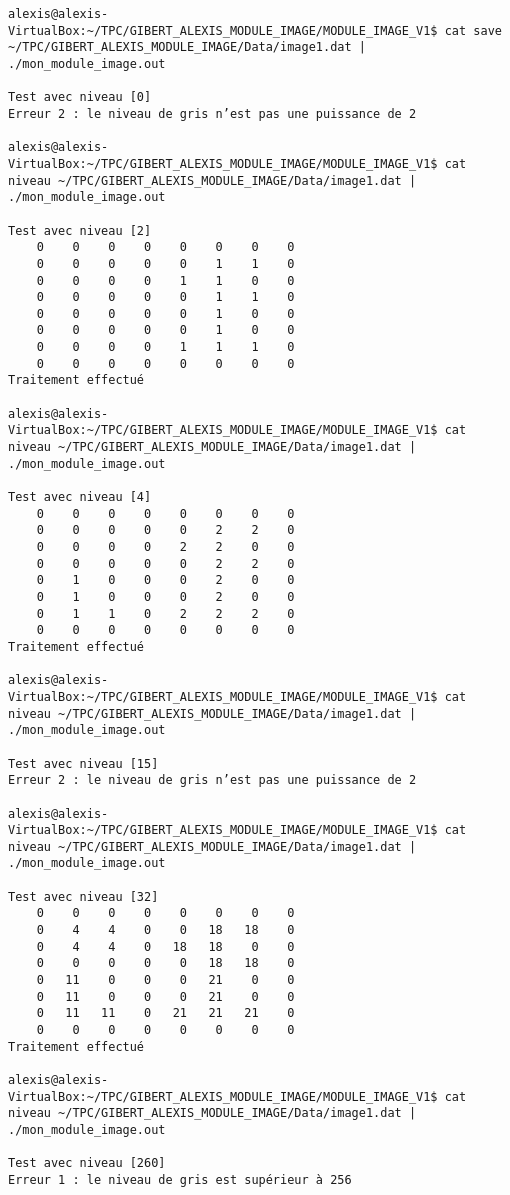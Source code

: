 \documentclass[11pt]{article}
\begin{document}
\begin{verbatim}
alexis@alexis-VirtualBox:~/TPC/GIBERT_ALEXIS_MODULE_IMAGE/MODULE_IMAGE_V1$ cat save ~/TPC/GIBERT_ALEXIS_MODULE_IMAGE/Data/image1.dat | ./mon_module_image.out

Test avec niveau [0]
Erreur 2 : le niveau de gris n’est pas une puissance de 2

alexis@alexis-VirtualBox:~/TPC/GIBERT_ALEXIS_MODULE_IMAGE/MODULE_IMAGE_V1$ cat niveau ~/TPC/GIBERT_ALEXIS_MODULE_IMAGE/Data/image1.dat | ./mon_module_image.out

Test avec niveau [2]
    0    0    0    0    0    0    0    0
    0    0    0    0    0    1    1    0
    0    0    0    0    1    1    0    0
    0    0    0    0    0    1    1    0
    0    0    0    0    0    1    0    0
    0    0    0    0    0    1    0    0
    0    0    0    0    1    1    1    0
    0    0    0    0    0    0    0    0
Traitement effectué

alexis@alexis-VirtualBox:~/TPC/GIBERT_ALEXIS_MODULE_IMAGE/MODULE_IMAGE_V1$ cat niveau ~/TPC/GIBERT_ALEXIS_MODULE_IMAGE/Data/image1.dat | ./mon_module_image.out

Test avec niveau [4]
    0    0    0    0    0    0    0    0
    0    0    0    0    0    2    2    0
    0    0    0    0    2    2    0    0
    0    0    0    0    0    2    2    0
    0    1    0    0    0    2    0    0
    0    1    0    0    0    2    0    0
    0    1    1    0    2    2    2    0
    0    0    0    0    0    0    0    0
Traitement effectué

alexis@alexis-VirtualBox:~/TPC/GIBERT_ALEXIS_MODULE_IMAGE/MODULE_IMAGE_V1$ cat niveau ~/TPC/GIBERT_ALEXIS_MODULE_IMAGE/Data/image1.dat | ./mon_module_image.out

Test avec niveau [15]
Erreur 2 : le niveau de gris n’est pas une puissance de 2

alexis@alexis-VirtualBox:~/TPC/GIBERT_ALEXIS_MODULE_IMAGE/MODULE_IMAGE_V1$ cat niveau ~/TPC/GIBERT_ALEXIS_MODULE_IMAGE/Data/image1.dat | ./mon_module_image.out

Test avec niveau [32]
    0    0    0    0    0    0    0    0
    0    4    4    0    0   18   18    0
    0    4    4    0   18   18    0    0
    0    0    0    0    0   18   18    0
    0   11    0    0    0   21    0    0
    0   11    0    0    0   21    0    0
    0   11   11    0   21   21   21    0
    0    0    0    0    0    0    0    0
Traitement effectué

alexis@alexis-VirtualBox:~/TPC/GIBERT_ALEXIS_MODULE_IMAGE/MODULE_IMAGE_V1$ cat niveau ~/TPC/GIBERT_ALEXIS_MODULE_IMAGE/Data/image1.dat | ./mon_module_image.out

Test avec niveau [260]
Erreur 1 : le niveau de gris est supérieur à 256
\end{verbatim}

    


    
    
    
    
\end{document}
